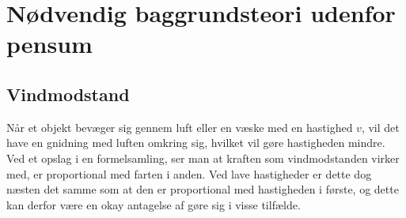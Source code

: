 \section{Nødvendig baggrundsteori udenfor pensum}
\subsection{Vindmodstand}\label{teori:vindmodstand}
Når et objekt bevæger sig gennem luft eller en væske med en hastighed $v$, vil det have en gnidning med luften omkring sig, hvilket vil gøre hastigheden mindre.
Ved et opslag i en formelsamling, ser man at kraften som vindmodstanden virker med, er proportional med farten i anden. 
Ved lave hastigheder er dette dog næsten det samme som at den er proportional med hastigheden i første, og dette kan derfor være en okay antagelse af gøre sig i visse tilfælde.
